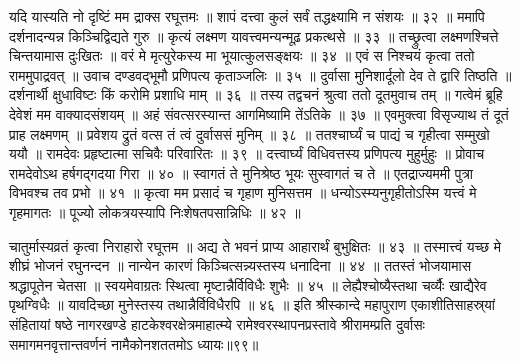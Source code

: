यदि यास्यति नो दृष्टिं मम द्राक्स रघूत्तमः ॥
शापं दत्त्वा कुलं सर्वं तद्धक्ष्यामि न संशयः ॥ ३२ ॥
ममापि दर्शनादन्यन्न किञ्चिद्विद्यते गुरु ॥
कृत्यं लक्ष्मण यावत्त्वमन्यन्मूढ़ प्रकत्थसे ॥ ३३ ॥
तच्छ्रुत्वा लक्ष्मणश्चित्ते चिन्तयामास दुःखितः ॥
वरं मे मृत्युरेकस्य मा भूयात्कुलसङ्क्षयः ॥ ३४ ॥
एवं स निश्चयं कृत्वा ततो राममुपाद्रवत् ॥
उवाच दण्डवद्भूमौ प्रणिपत्य कृताञ्जलिः ॥ ३५ ॥
दुर्वासा मुनिशार्दूलो देव ते द्वारि तिष्ठति ॥
दर्शनार्थी क्षुधाविष्टः किं करोमि प्रशाधि माम् ॥ ३६ ॥
तस्य तद्वचनं श्रुत्वा ततो दूतमुवाच तम् ॥
गत्वेमं ब्रूहि देवेशं मम वाक्यादसंशयम् ॥
अहं संवत्सरस्यान्त आगमिष्यामि तेंऽतिके ॥ ३७ ॥
एवमुक्त्वा विसृज्याथ तं दूतं प्राह लक्ष्मणम् ॥
प्रवेशय द्रुतं वत्स तं त्वं दुर्वाससं मुनिम् ॥ ३८ ॥
ततश्चार्घ्यं च पाद्यं च गृहीत्वा सम्मुखो ययौ ॥
रामदेवः प्रहृष्टात्मा सचिवैः परिवारितः ॥ ३९ ॥
दत्त्वार्घ्यं विधिवत्तस्य प्रणिपत्य मुहुर्मुहुः ॥
प्रोवाच रामदेवोऽथ हर्षगद्गदया गिरा ॥ ४० ॥
स्वागतं ते मुनिश्रेष्ठ भूयः सुस्वागतं च ते ॥
एतद्राज्यममी पुत्रा विभवश्च तव प्रभो ॥ ४१ ॥
कृत्वा मम प्रसादं च गृहाण मुनिसत्तम ॥
धन्योऽस्म्यनुगृहीतोऽस्मि यत्त्वं मे गृहमागतः ॥
पूज्यो लोकत्रयस्यापि निःशेषतपसान्निधिः ॥ ४२ ॥

चातुर्मास्यव्रतं कृत्वा निराहारो रघूत्तम ॥
अद्य ते भवनं प्राप्य आहारार्थं बुभुक्षितः ॥ ४३ ॥
तस्मात्त्वं यच्छ मे शीघ्रं भोजनं रघुनन्दन ॥
नान्येन कारणं किञ्चित्सन्न्यस्तस्य धनादिना ॥ ४४ ॥
ततस्तं भोजयामास श्रद्धापूतेन चेतसा ॥
स्वयमेवाग्रतः स्थित्वा मृष्टान्नैर्विविधैः शुभैः ॥ ४५ ॥
लेह्यैश्चोष्यैस्तथा चर्व्यैः खाद्यैरेव पृथग्विधैः ॥
यावदिच्छा मुनेस्तस्य तथान्नैर्विविधैरपि ॥ ४६ ॥
इति श्रीस्कान्दे महापुराण एकाशीतिसाहस्र्यां संहितायां षष्ठे नागरखण्डे हाटकेश्वरक्षेत्रमाहात्म्ये रामेश्वरस्थापनप्रस्तावे श्रीरामम्प्रति दुर्वासः समागमनवृत्तान्तवर्णनं नामैकोनशततमोऽ ध्यायः॥९९॥



